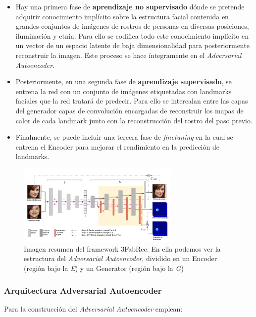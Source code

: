            \begin{itemize}
                \item Hay una primera fase de \textbf{aprendizaje no supervisado} dónde se pretende adquirir conocimiento implícito sobre la estructura facial contenida en grandes conjuntos de imágenes de rostros de personas en diversas posiciones, iluminación y etnia. Para ello se codifica todo este conocimiento implícito en un vector de un espacio latente de baja dimensionalidad para posteriormente reconstruir la imagen. Este proceso se hace íntegramente en el \textit{Adversarial Autoencoder}.
                \item Posteriormente, en una segunda fase de \textbf{aprendizaje supervisado}, se entrena la red con un conjunto de imágenes etiquetadas con landmarks faciales que la red tratará de predecir. Para ello se intercalan entre las capas del generador capas de convolución encargadas de reconstruir los mapas de calor de cada landmark junto con la reconstrucción del rostro del paso previo.
                \item Finalmente, se puede incluir una tercera fase de \textit{finetuning} en la cual se entrena el Encoder para mejorar el rendimiento en la predicción de landmarks.
            \end{itemize} 

            \begin{figure}[!h]
                \centering
                \includegraphics[width=0.7\textwidth]{img/3fabrec_arquitectura.png}
                \caption{Imagen resumen del framework 3FabRec. En ella podemos ver la estructura del \textit{Adversarial Autoencoder}, dividido en un Encoder (región bajo la \textit{E}) y un Generator (región bajo la \textit{G}) }
                \label{fig:3FabRec Resumen}
            \end{figure}

            \subsubsection{Arquitectura Adversarial Autoencoder}
                \noindent Para la construcción del \textit{Adversarial Autoencoder} emplean:
                
